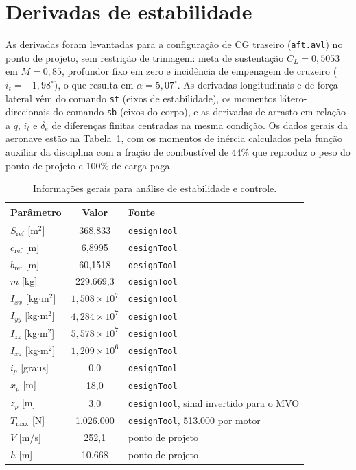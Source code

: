 \newpage
\section{Derivadas de estabilidade}

As derivadas foram levantadas para a configuração de CG traseiro
(\texttt{aft.avl}) no ponto de projeto, sem restrição de trimagem: meta de
sustentação $C_L = 0{,}5053$ em $M = 0{,}85$, profundor fixo em zero e
incidência de empenagem de cruzeiro ($i_t = -1{,}98^\circ$), o que resulta
em $\alpha = 5{,}07^\circ$. As derivadas longitudinais e de força lateral
vêm do comando \texttt{st} (eixos de estabilidade), os momentos
látero-direcionais do comando \texttt{sb} (eixos do corpo), e as derivadas
de arrasto em relação a $q$, $i_t$ e $\delta_e$ de diferenças finitas
centradas na mesma condição. Os dados gerais da aeronave estão na
Tabela~\ref{tab:dados_gerais}, com os momentos de inércia calculados pela
função auxiliar da disciplina com a fração de combustível de 44\% que
reproduz o peso do ponto de projeto e 100\% de carga paga.

\begin{table}[H]
\centering
\caption{Informações gerais para análise de estabilidade e controle.}\label{tab:dados_gerais}
\renewcommand{\arraystretch}{1.25}
\begin{tabular}{lcl}
\toprule
Parâmetro & Valor & Fonte \\
\midrule
$S_{\mathrm{ref}}$ [m$^2$] & 368,833 & \texttt{designTool} \\
$c_{\mathrm{ref}}$ [m] & 6,8995 & \texttt{designTool} \\
$b_{\mathrm{ref}}$ [m] & 60,1518 & \texttt{designTool} \\
$m$ [kg] & 229.669,3 & \texttt{designTool} \\
$I_{xx}$ [kg$\cdot$m$^2$] & $1{,}508\times 10^{7}$ & \texttt{designTool} \\
$I_{yy}$ [kg$\cdot$m$^2$] & $4{,}284\times 10^{7}$ & \texttt{designTool} \\
$I_{zz}$ [kg$\cdot$m$^2$] & $5{,}578\times 10^{7}$ & \texttt{designTool} \\
$I_{xz}$ [kg$\cdot$m$^2$] & $1{,}209\times 10^{6}$ & \texttt{designTool} \\
$i_p$ [graus] & 0,0 & \texttt{designTool} \\
$x_p$ [m] & 18,0 & \texttt{designTool} \\
$z_p$ [m] & 3,0 & \texttt{designTool}, sinal invertido para o MVO \\
$T_{\mathrm{max}}$ [N] & 1.026.000 & \texttt{designTool}, 513.000 por motor \\
$V$ [m/s] & 252,1 & ponto de projeto \\
$h$ [m] & 10.668 & ponto de projeto \\
\bottomrule
\end{tabular}
\end{table}

